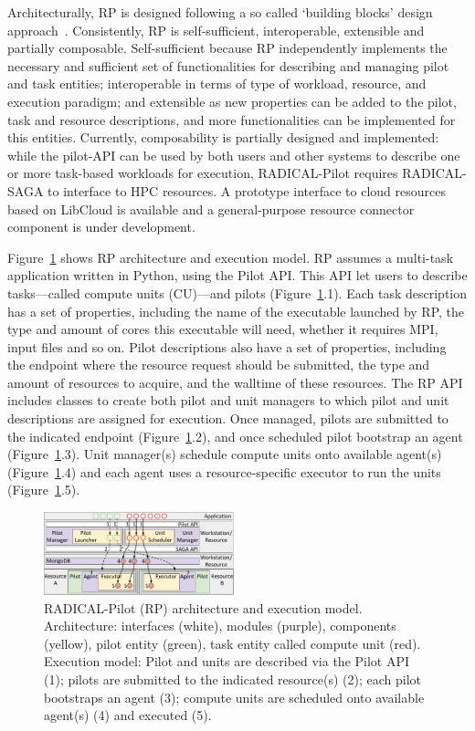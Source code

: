 \documentclass{webofc}
\begin{document}
Architecturally, RP is designed following a so called ‘building blocks’
design approach~\cite{turilli2018building}. Consistently, RP is
self-sufficient, interoperable, extensible and partially composable.
Self-sufficient because RP independently implements the necessary and
sufficient set of functionalities for describing and managing pilot and task
entities; interoperable in terms of type of workload, resource, and execution
paradigm; and extensible as new properties can be added to the pilot, task
and resource descriptions, and more functionalities can be implemented for
this entities. Currently, composability is partially designed and
implemented: while the pilot-API can be used by both users and other systems
to describe one or more task-based workloads for execution, RADICAL-Pilot
requires RADICAL-SAGA to interface to HPC resources. A prototype interface to
cloud resources based on LibCloud is available and a general-purpose resource
connector component is under development.	
	
Figure~\ref{fig:rp-arch} shows RP architecture and execution model. RP
assumes a multi-task application written in Python, using the Pilot API. This
API let users to describe tasks---called compute units (CU)---and pilots
(Figure~\ref{fig:rp-arch}.1). Each task description has a set of properties,
including the name of the executable launched by RP, the type and amount of
cores this executable will need, whether it requires MPI, input files and so
on. Pilot descriptions also have a set of properties, including the endpoint
where the resource request should be submitted, the type and amount of
resources to acquire, and the walltime of these resources. The RP API
includes classes to create both pilot and unit managers to which pilot and
unit descriptions are assigned for execution. Once managed, pilots are
submitted to the indicated endpoint (Figure~\ref{fig:rp-arch}.2), and once
scheduled pilot bootstrap an agent (Figure~\ref{fig:rp-arch}.3). Unit
manager(s) schedule compute units onto available agent(s)
(Figure~\ref{fig:rp-arch}.4) and each agent uses a resource-specific executor
to run the units (Figure~\ref{fig:rp-arch}.5).

\begin{figure}
  \centering
  \includegraphics[width=0.49\textwidth]{figures/rp_arch.pdf}
  \caption{RADICAL-Pilot (RP) architecture and execution model.
           Architecture: interfaces (white), modules (purple), components
           (yellow), pilot entity (green), task entity called compute unit
           (red). Execution model: Pilot and units are described via the
           Pilot API (1); pilots are submitted to the indicated resource(s)
           (2); each pilot bootstraps an agent (3); compute units are
           scheduled onto available agent(s) (4) and executed
           (5).}\label{fig:rp-arch}
\end{figure}
	
\end{document}
